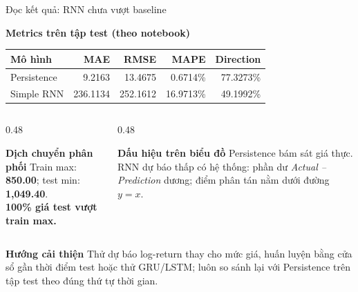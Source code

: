 \documentclass[aspectratio=169, 10pt]{beamer}
\begin{document}
\begin{frame}{Đọc kết quả: RNN chưa vượt baseline}
\small
\begin{block}{\textbf{Metrics trên tập test (theo notebook)}}
\centering
\begin{tabular}{lrrrr}
\toprule
\textbf{Mô hình} & \textbf{MAE} & \textbf{RMSE} & \textbf{MAPE} & \textbf{Direction} \\
\midrule
Persistence & 9.2163 & 13.4675 & 0.6714\% & 77.3273\% \\
Simple RNN & 236.1134 & 252.1612 & 16.9713\% & 49.1992\% \\
\bottomrule
\end{tabular}
\end{block}
\vspace{0.12cm}
\begin{columns}[T]
\begin{column}{0.48\textwidth}
\begin{alertblock}{\textbf{Dịch chuyển phân phối}}
Train max: \textbf{850.00}; test min: \textbf{1,049.40}.\\[1mm]
\textbf{100\% giá test vượt train max.}
\end{alertblock}
\end{column}
\begin{column}{0.48\textwidth}
\begin{exampleblock}{\textbf{Dấu hiệu trên biểu đồ}}
Persistence bám sát giá thực. RNN dự báo thấp có hệ thống: phần dư \emph{Actual -- Prediction} dương; điểm phân tán nằm dưới đường $y=x$.
\end{exampleblock}
\end{column}
\end{columns}
\vspace{0.1cm}
\begin{block}{\textbf{Hướng cải thiện}}
Thử dự báo log-return thay cho mức giá, huấn luyện bằng cửa sổ gần thời điểm test hoặc thử GRU/LSTM; luôn so sánh lại với Persistence trên tập test theo đúng thứ tự thời gian.
\end{block}
\end{frame}
\end{document}
